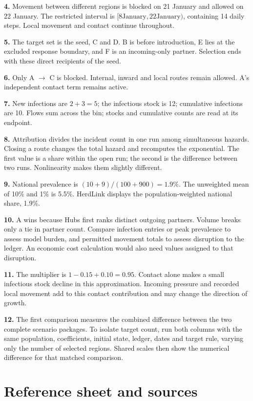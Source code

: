 \documentclass[11pt,a4paper]{article}
\begin{document}
\textbf{4.} Movement between different regions is blocked on 21 January
and allowed on 22 January. The restricted interval is
\([8 \text{January}, 22 \text{January})\), containing 14 daily steps.
Local movement and contact continue throughout.

\textbf{5.} The target set is the seed, C and D. B is before
introduction, E lies at the excluded response boundary, and F is an
incoming-only partner. Selection ends with these direct recipients of
the seed.

\textbf{6.} Only A \ensuremath{\rightarrow} C is blocked. Internal, inward and local routes
remain allowed. A's independent contact term remains active.

\textbf{7.} New infections are \(2 + 3 = 5\); the infectious stock is
12; cumulative infections are 10. Flows sum across the bin; stocks and
cumulative counts are read at its endpoint.

\textbf{8.} Attribution divides the incident count in one run among
simultaneous hazards. Closing a route changes the total hazard and
recomputes the exponential. The first value is a share within the open
run; the second is the difference between two runs. Nonlinearity makes
them slightly different.

\textbf{9.} National prevalence is \((10+9)/(100+900) = 1.9\%\). The
unweighted mean of 10\% and 1\% is 5.5\%. HerdLink displays the
population-weighted national share, 1.9\%.

\textbf{10.} A wins because Hubs first ranks distinct outgoing partners.
Volume breaks only a tie in partner count. Compare infection entries or
peak prevalence to assess model burden, and permitted movement totals to
assess disruption to the ledger. An economic cost calculation would also
need values assigned to that disruption.

\textbf{11.} The multiplier is \(1-0.15+0.10 = 0.95\). Contact alone
makes a small infectious stock decline in this approximation. Incoming
pressure and recorded local movement add to this contact contribution
and may change the direction of growth.

\textbf{12.} The first comparison measures the combined difference
between the two complete scenario packages. To isolate target count, run
both columns with the same population, coefficients, initial state,
ledger, dates and target rule, varying only the number of selected
regions. Shared scales then show the numerical difference for that
matched comparison.

\section{Reference sheet and sources}\label{reference-sheet-and-sources}
\end{document}
